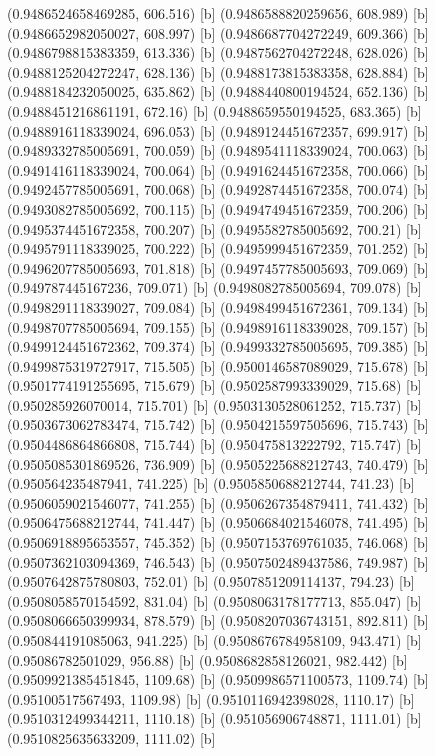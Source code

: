 {{{(0.9486524658469285, 606.516) [b] 
(0.9486588820259656, 608.989) [b] 
(0.9486652982050027, 608.997) [b] 
(0.9486687704272249, 609.366) [b] 
(0.9486798815383359, 613.336) [b] 
(0.9487562704272248, 628.026) [b] 
(0.9488125204272247, 628.136) [b] 
(0.9488173815383358, 628.884) [b] 
(0.9488184232050025, 635.862) [b] 
(0.9488440800194524, 652.136) [b] 
(0.9488451216861191, 672.16) [b] 
(0.9488659550194525, 683.365) [b] 
(0.9488916118339024, 696.053) [b] 
(0.9489124451672357, 699.917) [b] 
(0.9489332785005691, 700.059) [b] 
(0.9489541118339024, 700.063) [b] 
(0.9491416118339024, 700.064) [b] 
(0.9491624451672358, 700.066) [b] 
(0.9492457785005691, 700.068) [b] 
(0.9492874451672358, 700.074) [b] 
(0.9493082785005692, 700.115) [b] 
(0.9494749451672359, 700.206) [b] 
(0.9495374451672358, 700.207) [b] 
(0.9495582785005692, 700.21) [b] 
(0.9495791118339025, 700.222) [b] 
(0.9495999451672359, 701.252) [b] 
(0.9496207785005693, 701.818) [b] 
(0.9497457785005693, 709.069) [b] 
(0.949787445167236, 709.071) [b] 
(0.9498082785005694, 709.078) [b] 
(0.9498291118339027, 709.084) [b] 
(0.9498499451672361, 709.134) [b] 
(0.9498707785005694, 709.155) [b] 
(0.9498916118339028, 709.157) [b] 
(0.9499124451672362, 709.374) [b] 
(0.9499332785005695, 709.385) [b] 
(0.9499875319727917, 715.505) [b] 
(0.9500146587089029, 715.678) [b] 
(0.9501774191255695, 715.679) [b] 
(0.9502587993339029, 715.68) [b] 
(0.950285926070014, 715.701) [b] 
(0.9503130528061252, 715.737) [b] 
(0.9503673062783474, 715.742) [b] 
(0.9504215597505696, 715.743) [b] 
(0.9504486864866808, 715.744) [b] 
(0.950475813222792, 715.747) [b] 
(0.9505085301869526, 736.909) [b] 
(0.9505225688212743, 740.479) [b] 
(0.950564235487941, 741.225) [b] 
(0.9505850688212744, 741.23) [b] 
(0.9506059021546077, 741.255) [b] 
(0.9506267354879411, 741.432) [b] 
(0.9506475688212744, 741.447) [b] 
(0.9506684021546078, 741.495) [b] 
(0.9506918895653557, 745.352) [b] 
(0.9507153769761035, 746.068) [b] 
(0.9507362103094369, 746.543) [b] 
(0.9507502489437586, 749.987) [b] 
(0.9507642875780803, 752.01) [b] 
(0.9507851209114137, 794.23) [b] 
(0.9508058570154592, 831.04) [b] 
(0.9508063178177713, 855.047) [b] 
(0.9508066650399934, 878.579) [b] 
(0.9508207036743151, 892.811) [b] 
(0.950844191085063, 941.225) [b] 
(0.9508676784958109, 943.471) [b] 
(0.95086782501029, 956.88) [b] 
(0.9508682858126021, 982.442) [b] 
(0.9509921385451845, 1109.68) [b] 
(0.9509986571100573, 1109.74) [b] 
(0.95100517567493, 1109.98) [b] 
(0.9510116942398028, 1110.17) [b] 
(0.9510312499344211, 1110.18) [b] 
(0.951056906748871, 1111.01) [b] 
(0.9510825635633209, 1111.02) [b] 
}}}
